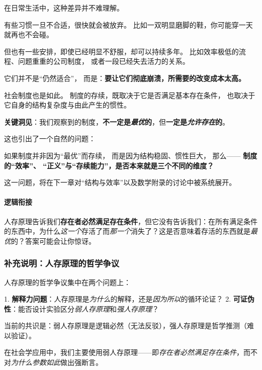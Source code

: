 \documentclass[../main.tex]{subfiles}
\begin{document}
	
	在日常生活中，这种差异并不难理解。
	
	有些习惯一旦不合适，很快就会被放弃。  
	比如一双明显磨脚的鞋，你可能穿一天就再也不会碰。
	
	但也有一些安排，即使已经明显不舒服，却可以持续多年。  
	比如效率极低的流程、问题重重的公司制度，  
	或者一段已经失去活力的关系。
	
	它们并不是“仍然适合”，  
	而是：\textbf{要让它们彻底崩溃，所需要的改变成本太高。}
	
	社会制度也是如此。  
	制度的存续，既取决于它是否满足基本存在条件，  
	也取决于它自身的结构复杂度与由此产生的惯性。
	
	
	\textbf{\Large 关键洞见}：我们观察到的制度，\textbf{不一定是\textit{最优}的}，但\textbf{一定是\textit{允许存在}的}。
	
	这也引出了一个自然的问题：
	
	如果制度并非因为“最优”而存续，  
	而是因为结构稳固、惯性巨大，  
	那么——  
	\textbf{制度的“效率”、 “正义”与“存续能力”，是否本来就是三个不同的维度？}
	
	这一问题，将在下一章对“结构与效率”以及数学附录的讨论中被系统展开。
	
	

	\paragraph*{逻辑衔接}
	人存原理告诉我们\textbf{存在者必然满足存在条件}，但它没有告诉我们：在所有满足条件的东西中，为什么\textit{这一个}存活了而\textit{那一个}消失了？这是否意味着存活的东西就是\textit{最优}的？答案可能会让你惊讶。

	\subsubsection*{补充说明：人存原理的哲学争议}
	\begin{tcolorbox}[
		colback=gray!5,
		colframe=gray!40,
		title=\small \textit{哲学澄清（可跳过）},
		fonttitle=\bfseries
		]
		\small
		人存原理的哲学争议集中在两个问题上：

		1. \textbf{解释力问题}：人存原理是\textit{为什么}的解释，还是\textit{因为所以}的循环论证？
		2. \textbf{可证伪性}：能否设计实验区分\textit{弱人存原理}和\textit{强人存原理}？

		当前的共识是：弱人存原理是逻辑必然（无法反驳），强人存原理是哲学推测（难以验证）。

		在社会学应用中，我们主要使用弱人存原理——即\textit{存在者必然满足存在条件}，而不对\textit{为什么参数如此}做出强断言。
	\end{tcolorbox}
\end{document}
